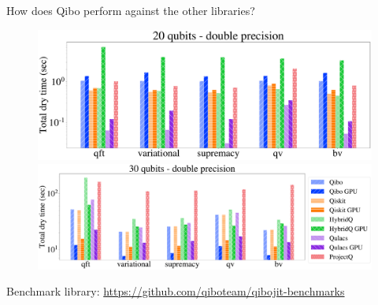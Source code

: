 \documentclass[11p,aspectratio=169]{beamer}
\begin{document}

    


\begin{frame}{How does Qibo perform against the other libraries?}
    \begin{figure}
        \centering
        \includegraphics[height=0.4\textheight]{figures/libraries_double_20qubits_total_dry_time.pdf}
        \includegraphics[height=0.31\textheight]{figures/libraries_double_30qubits_total_dry_time.pdf}
    \end{figure}
    Benchmark library: \url{https://github.com/qiboteam/qibojit-benchmarks}
    
\end{frame}
\end{document}
